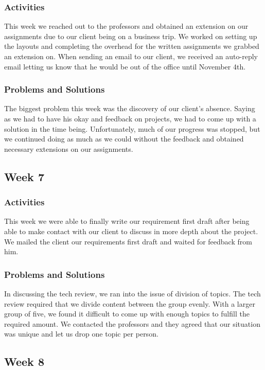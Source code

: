 \documentclass[journal,10pt,onecolumn,compsoc]{IEEEtran} \usepackage[margin=1.0in]{geometry} \usepackage{pdfpages}
\begin{document}
    \subsubsection{Activities}
    This week we reached out to the professors and obtained an extension on our assignments due to our client being on a business trip. We worked on setting up the layouts and completing the overhead for the written assignments we grabbed an extension on. When sending an email to our client, we received an auto-reply email letting us know that he would be out of the office until November 4th.
    \subsubsection{Problems and Solutions}
    The biggest problem this week was the discovery of our client's absence. Saying as we had to have his okay and feedback on projects, we had to come up with a solution in the time being. Unfortunately, much of our progress was stopped, but we continued doing as much as we could without the feedback and obtained necessary extensions on our assignments.
    
\subsection{Week 7}
    \subsubsection{Activities}
    This week we were able to finally write our requirement first draft after being able to make contact with our client to discuss in more depth about the project. We mailed the client our requirements first draft and waited for feedback from him.
    \subsubsection{Problems and Solutions}
    In discussing the tech review, we ran into the issue of division of topics. The tech review required that we divide content between the group evenly. With a larger group of five, we found it difficult to come up with enough topics to fulfill the required amount. We contacted the professors and they agreed that our situation was unique and let us drop one topic per person.
    
\subsection{Week 8}
\end{document}
